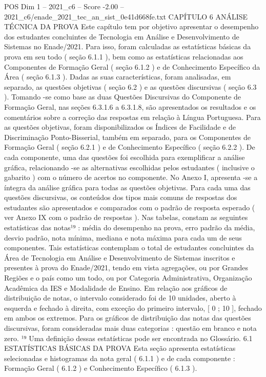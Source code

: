 \begin{textsample}{POS Dim 1 – 2021\_c6 – Score -2.00 – 2021\_c6/enade\_2021\_tec\_an\_sist\_0e41d668fe.txt}  \label{ex:f1_pos_207}
CAPÍTULO 6 ANÁLISE TÉCNICA DA PROVA Este capítulo tem por objetivo apresentar o desempenho dos estudantes concluintes de Tecnologia em Análise e Desenvolvimento de Sistemas no Enade/2021.
Para isso, foram calculadas as estatísticas básicas da prova em seu todo ( seção 6.1.1 ), bem como as estatísticas relacionadas aos Componentes de Formação Geral ( seção 6.1.2 ) e de Conhecimento Específico da Área ( seção 6.1.3 ).
Dadas as suas características, foram analisadas, em separado, as questões objetivas ( seção 6.2 ) e as questões discursivas ( seção 6.3 ).
Tomando -se como base as duas Questões Discursivas do Componente de Formação Geral, nas seções 6.3.1.6 a 6.3.1.8, são apresentados os resultados e os comentários sobre a correção das respostas em relação à Língua Portuguesa.
Para as questões objetivas, foram disponibilizados os Índices de Facilidade e de Discriminação Ponto-Bisserial, também em separado, para os Componentes de Formação Geral ( seção 6.2.1 ) e de Conhecimento Específico ( seção 6.2.2 ).
De cada componente, uma das questões foi escolhida para exemplificar a análise gráfica, relacionando -se as alternativas escolhidas pelos estudantes ( inclusive o gabarito ) com o número de acertos no componente.
No Anexo I, apresenta -se a íntegra da análise gráfica para todas as questões objetivas.
Para cada uma das questões discursivas, os conteúdos dos tipos mais comuns de respostas dos estudantes são apresentados e comparados com o padrão de resposta esperado ( ver Anexo IX com o padrão de respostas ).
Nas tabelas, constam as seguintes estatísticas das notas¹⁹ : média do desempenho na prova, erro padrão da média, desvio padrão, nota mínima, mediana e nota máxima para cada um de seus componentes.
Tais estatísticas contemplam o total de estudantes concluintes da Área de Tecnologia em Análise e Desenvolvimento de Sistemas inscritos e presentes à prova do Enade/2021, tendo em vista agregações, ou por Grandes Regiões e o país como um todo, ou por Categoria Administrativa, Organização Acadêmica da IES e Modalidade de Ensino.
Em relação aos gráficos de distribuição de notas, o intervalo considerado foi de 10 unidades, aberto à esquerda e fechado à direita, com exceção do primeiro intervalo, [ 0 ; 10 ], fechado em ambos os extremos.
Para os gráficos de distribuição das notas das questões discursivas, foram consideradas mais duas categorias : questão em branco e nota zero. ¹⁹ Uma definição dessas estatísticas pode ser encontrada no Glossário. 6.1 ESTATÍSTICAS BÁSICAS DA PROVA Esta seção apresenta estatísticas selecionadas e histogramas da nota geral ( 6.1.1 ) e de cada componente : Formação Geral ( 6.1.2 ) e Conhecimento Específico ( 6.1.3 ).

\end{textsample}
